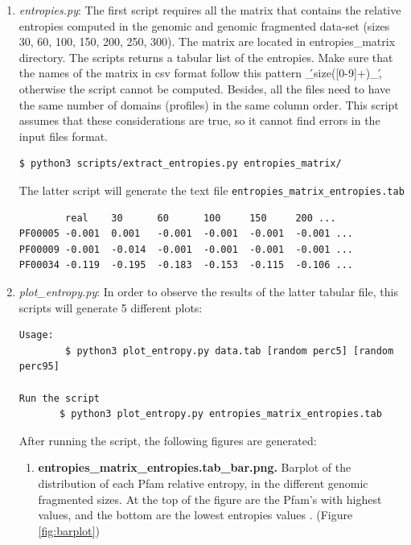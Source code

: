 \documentclass[12pt]{report}
\begin{document}
\begin{enumerate}

\item  \textit{entropies.py}: The first script requires all the matrix that
contains the relative entropies computed in the genomic and genomic 
fragmented data-set (sizes 30, 60, 100, 150, 200, 250, 
300). The matrix are located in entropies\_matrix 
directory. The scripts  returns a tabular list of the 
entropies. Make sure that the names of the matrix in csv 
format follow this pattern \'\_size([0-9]+)\_\', otherwise 
the script cannot be computed. Besides, all the files need to 
have the same number of domains (profiles) in the same column 
order. This script assumes that these considerations are true, 
so it cannot find errors in the input files format.
\begin{verbatim}
$ python3 scripts/extract_entropies.py entropies_matrix/
\end{verbatim}
The latter script will generate the text file \verb+entropies_matrix_entropies.tab+
\begin{verbatim}
        real    30      60      100     150     200 ...    
PF00005 -0.001  0.001   -0.001  -0.001  -0.001  -0.001 ...
PF00009 -0.001  -0.014  -0.001  -0.001  -0.001  -0.001 ...
PF00034 -0.119  -0.195  -0.183  -0.153  -0.115  -0.106 ...
\end{verbatim}

\item \textit{plot\_entropy.py}: In order to observe the results of the latter
tabular file, this scripts will generate 5 different plots:
\begin{verbatim}
Usage:
        $ python3 plot_entropy.py data.tab [random perc5] [random perc95]

Run the script
       $ python3 plot_entropy.py entropies_matrix_entropies.tab
\end{verbatim}

After running the script, the following figures are generated: 
\begin{enumerate}

\item \textbf{entropies\_matrix\_entropies.tab\_bar.png.} Barplot of the
distribution of each Pfam relative entropy, in the different genomic fragmented
sizes. At the top of the figure are the  Pfam's with highest values, and the
bottom are the lowest entropies values . (Figure \ref{fig:barplot})


\end{enumerate}
\end{enumerate}
\end{document}

